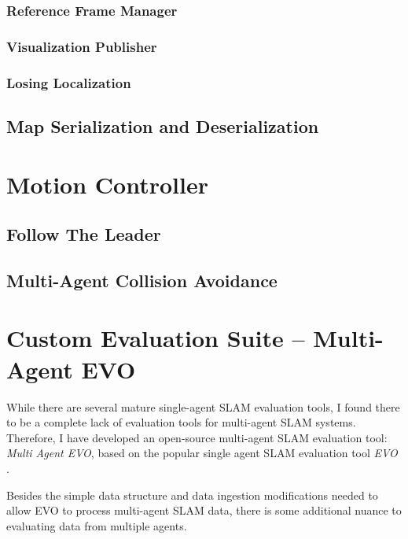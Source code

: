 \subsubsection{Reference Frame Manager}
\label{sec:reference-frame-manager}

\subsubsection{Visualization Publisher}
\label{sec:visualization-publisher}

\subsubsection{Losing Localization}
\label{sec:losing-localization}

\subsection{Map Serialization and Deserialization}
\label{sec:map-serialization-and-deserialization}

\section{Motion Controller}
\label{sec:motion-controller}

\subsection{Follow The Leader}
\label{sec:follow-the-leader}

\subsection{Multi-Agent Collision Avoidance}
\label{sec:multi-agent-collision-avoidance}

\section{Custom Evaluation Suite – Multi-Agent EVO}
\label{sec:multi-agent-evo}
While there are several mature single-agent SLAM evaluation tools, I found there to be a complete lack of evaluation tools for multi-agent SLAM systems. Therefore, I have developed an open-source multi-agent SLAM evaluation tool: \textit{Multi Agent EVO}, based on the popular single agent SLAM evaluation tool \textit{EVO} \autocite{grupp2017evo}.

Besides the simple data structure and data ingestion modifications needed to allow EVO to process multi-agent SLAM data, there is some additional nuance to evaluating data from multiple agents.

